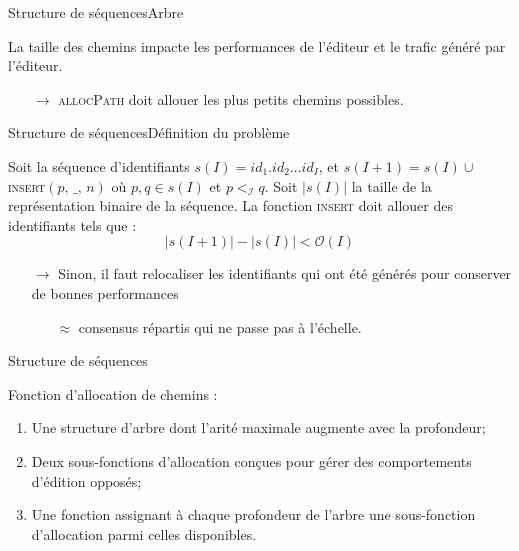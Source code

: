 \begin{frame}{Structure de séquences}{Arbre}
  
  \begin{center}
    
  \end{center}
  
  \vspace{0.5cm}
  
  La taille des chemins impacte les performances de l'éditeur et le trafic
  généré par l'éditeur.
  \begin{itemize}
  \item [$\rightarrow$] \textsc{allocPath} doit allouer les plus petits chemins
    possibles.
  \end{itemize}

\end{frame}


\begin{frame}{Structure de séquences}{Définition du problème}

  \begin{problem}
    Soit la séquence d'identifiants $s(I)= id_1.id_2\ldots id_I$, et
    $s(I+1) = s(I) \cup $\textsc{insert}$(p,\, \_,\, n)$ où $p,q \in s(I)$ et
    $p<_\mathcal{I}q$. Soit $|s(I)|$ la taille de la représentation binaire de la
    séquence. La fonction \textsc{insert} doit allouer des identifiants tels que :
    \begin{equation}
      |s(I+1)| - |s(I)| < \mathcal{O}(I)
    \end{equation}
  \end{problem}
  
  \vspace{0.5cm}

  \begin{itemize}
  \item [$\rightarrow$] Sinon, il faut relocaliser les identifiants qui ont été
    générés pour conserver de bonnes performances
    \begin{itemize}
    \item [$\approx$] consensus répartis qui ne passe pas à l'échelle.
    \end{itemize}
  \end{itemize}

\end{frame}


\begin{frame}{Structure de séquences}{\LSEQ}
  
  Fonction d'allocation de chemins :
  \begin{enumerate}
  \item Une structure d'arbre dont l'arité maximale augmente avec la profondeur;
  \item Deux sous-fonctions d'allocation conçues pour gérer des comportements
    d'édition opposés;
  \item Une fonction assignant à chaque profondeur de l'arbre une sous-fonction
    d'allocation parmi celles disponibles.
  \end{enumerate}
  
\end{frame}


